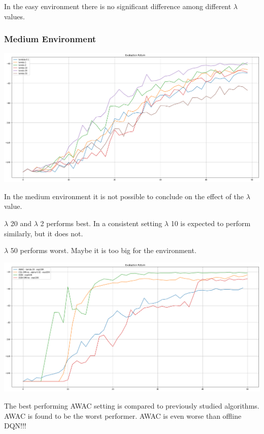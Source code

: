 \documentclass[11pt]{article}
\begin{document}
    In the easy environment there is no significant difference among different $\lambda$ values.

    \subsubsection{Medium Environment}

    \hspace*{-0.3in}
    \includegraphics[scale=0.30]{q4/eval-medium-unsupervised}

    In the medium environment it is not possible to conclude on the effect of the $ \lambda $ value.

    $\lambda$ 20 and $\lambda$ 2 performs best.
    In a consistent setting $\lambda$ 10 is expected to perform similarly, but it does not.

    $\lambda$ 50 performs worst.
    Maybe it is too big for the environment.

    \hspace*{-0.3in}
    \includegraphics[scale=0.30]{q4/eval-medium-unsupervised-compared}

    The best performing AWAC setting is compared to previously studied algorithms.
    AWAC is found to be the worst performer.
    AWAC is even worse than offline DQN!!!
\end{document}
